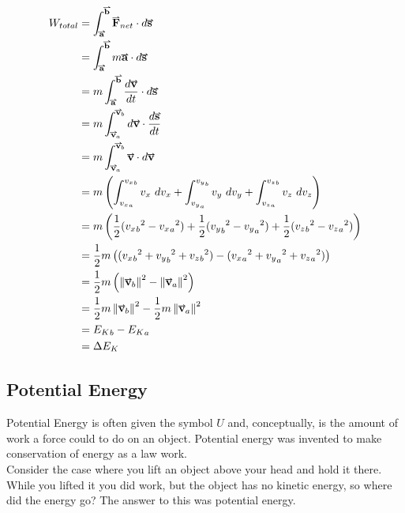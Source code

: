 \documentclass[main.tex]{subfiles}
\begin{document}
                        \begin{align*}
                            W_{total} &= \int_{\vect{a}}^{\vect{b}} \vect{F}_{net} \cdot d\vect{s}\\
                            &= \int_{\vect{a}}^{\vect{b}} m\vect{a} \cdot d\vect{s}\\
                            &= m\int_{\vect{a}}^{\vect{b}} \frac{d\vect{v}}{dt} \cdot d\vect{s}\\
                            &= m\int_{\vect{v}_a}^{\vect{v}_b} d\vect{v} \cdot \frac{d\vect{s}}{dt}\\
                            &= m\int_{\vect{v}_a}^{\vect{v}_b} \vect{v} \cdot d\vect{v}\\
                            &= m\left(\int_{{v_x}_a}^{{v_x}_b} v_x \ud v_x + \int_{{v_y}_a}^{{v_y}_b} v_y \ud v_y + \int_{{v_z}_a}^{{v_z}_b} v_z \ud v_z\right)\\
                            &= m\left(\frac{1}{2}({{v_x}_b}^2 - {{v_x}_a}^2) + \frac{1}{2}({{v_y}_b}^2 - {{v_y}_a}^2) + \frac{1}{2}({{v_z}_b}^2 - {{v_z}_a}^2)\right)\\
                            &= \frac{1}{2}m\left(({{v_x}_b}^2 + {{v_y}_b}^2 + {{v_z}_b}^2) - ({{v_x}_a}^2 + {{v_y}_a}^2 +{{v_z}_a}^2)\right)\\
                            &= \frac{1}{2}m\left(\vmod{\vect{v}_b}^2 - \vmod{\vect{v}_a}^2\right)\\
                            &= \frac{1}{2}m\vmod{\vect{v}_b}^2 - \frac{1}{2}m\vmod{\vect{v}_a}^2\\
                            &= {E_K}_b - {E_K}_a\\
                            &= \Delta E_K
                        \end{align*}

                \subsection{Potential Energy}
                    \label{subsec: Potential Energy}

                    Potential Energy is often given the symbol $U$ and, conceptually, is the amount of work a force could to do on an object. Potential energy was invented to make conservation of energy as a law work.\\
                    Consider the case where you lift an object above your head and hold it there. While you lifted it you did work, but the object has no kinetic energy, so where did the energy go? The answer to this was potential energy.
\end{document}
